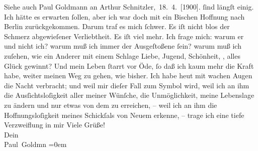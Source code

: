 \begin{ledgroupsized}[t]{13cm}
{{{                  Siehe auch Paul Goldmann an Arthur Schnitzler, 18. 4. [1900].}}}\label{K_L02932-1h} ſind längſt
               einig. Ich hätte es erwarten ſollen, aber ich war doch mit ein Bischen Hoffnung nach
                  Berlin zurückgekommen. Darum traf es mich
               ſchwer. Es iſt nicht blos der Schmerz abgewieſener Verliebtheit. Es iſt viel mehr.
               Ich frage mich: warum er und nicht ich? warum muß ich immer der Ausgeſtoßene ſein?
               warum muß ich {\pb}zuſehen, wie ein Anderer mit einem Schlage Liebe, Jugend,
               Schönheit, \label{K_L02932-2v}\label{K_L02932-2h}, alles Glück gewinnt? Und mein Leben ſtarrt vor Öde,
               ſo daß ich kaum mehr die Kraft habe, weiter meinen Weg zu gehen, wie bisher. Ich habe
                  heut mit wachen Augen die Nacht verbracht; und weil
               mir dieſer Fall zum Symbol wird, weil ich an ihm die Ausſichtsloſigkeit aller meiner
               Wünſche, die Unmöglichkeit, meine Lebenslage zu ändern und nur etwas von dem \label{K_L02932-3v}\label{K_L02932-3h} zu erreichen, – weil ich an ihm die
               Hoffnungsloſigkeit meines Schickſals von Neuem erkenne, – trage ich eine tiefe
               Verzweiflung in mir{\dotsfive}\pend
           \pstart
           Viele Grüße! {\\[\baselineskip]}Dein {\\[\baselineskip]}\spacefill\mbox{Paul Goldmn}\pend
           \leftskip=0em{}
         
         \endnumbering{}\end{ledgroupsized}  \newcommand{\dateiname}{L02932}\newcommand{\titel}{Paul Goldmann an Arthur Schnitzler, 20. 9. [1900]}\newcommand{\editorInnen}{Martin Anton Müller und Laura Untner}
      